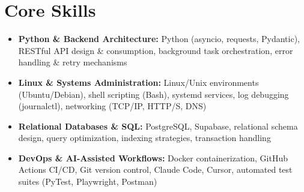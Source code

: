 \documentclass[a4paper,10pt]{article}
\begin{document}
\section{Core Skills}
\begin{itemize}
 \item \textbf{Python \& Backend Architecture:} Python (asyncio, requests, Pydantic), RESTful API design \& consumption, background task orchestration, error handling \& retry mechanisms
 \item \textbf{Linux \& Systems Administration:} Linux/Unix environments (Ubuntu/Debian), shell scripting (Bash), systemd services, log debugging (journalctl), networking (TCP/IP, HTTP/S, DNS)
 \item \textbf{Relational Databases \& SQL:} PostgreSQL, Supabase, relational schema design, query optimization, indexing strategies, transaction handling
 \item \textbf{DevOps \& AI-Assisted Workflows:} Docker containerization, GitHub Actions CI/CD, Git version control, Claude Code, Cursor, automated test suites (PyTest, Playwright, Postman)
\end{itemize}
\end{document}
